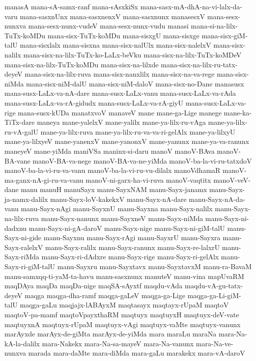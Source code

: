 {manasA
mana-sA-samx-ranf
mana-sAsxkiSx
mana-sasx-mA-dhA-na-vi-lalx-da-varu
mana-sasxnUnx
mana-sasxnenxV
mana-sasxnunx
manasesxV
mana-sesx-nunxva
mana-sesx-nunx-vudeV
mana-sesx-nunx-vudu
manasi
mana-si-na-lilx-TuTx-koMDu
mana-sisx-TuTx-koMDu
mana-sisxgU
mana-sisxge
mana-sisx-giM-talU
mana-sisxlalx
mana-sisxna
mana-sisx-nalUlx
mana-sisx-nalelxV
mana-sisx-nalilx
mana-sisx-na-lilx-TuTx-ko-LaLx-beVku
mana-sisx-na-lilx-TuTx-koMDeV
mana-sisx-na-lilx-TuTx-koMDu
mana-sisx-na-lilxde
mana-sisx-na-lilx-ru-tatx-deyeV
mana-sisx-na-lilx-ruva
mana-sisx-nanxlilx
mana-sisx-na-va-rege
mana-sisx-niMda
mana-sisx-niM-dalU
mana-sisx-niM-daloV
mana-sisx-no-Dane
manasusx
mana-susx-LaLx-va-nA-dare
mana-susx-LaLx-vanu
mana-susx-LaLx-va-rAda
mana-susx-LaLx-va-rA-gidudx
mana-susx-LaLx-va-rA-giyU
mana-susx-LaLx-va-rige
mana-susx-kUDa
manatxvoV
manaveV
mane
mane-ga-Lige
manege
mane-ka-TiTx-dare
maneya
mane-yalelxV
mane-yalilx
mane-ya-lilx-ru-vAga
mane-ya-lilx-ru-vA-galU
mane-ya-lilx-ruva
mane-ya-lilx-ru-va-va-ri-gelAlx
mane-ya-lilxyU
mane-ya-lilxyeV
mane-yanenxV
mane-yanonxV
mane-yanunx
mane-ya-va-ranunx
maneyeV
mane-yiMda
maniVSa
maninx-si-daru
manoV
manoV-BAva
manoV-BA-vane
manoV-BA-va-nege
manoV-BA-va-ne-yiMda
manoV-ba-la-vi-ru-tatxdoV
manoV-ba-la-vi-ru-va-vanu
manoV-ba-la-vi-ru-vu-dilalx
manoVdhamaR
manoV-ma-ganx-nA-gi-ru-va-vanu
manoV-ni-garx-ha-vi-ruva
manoV-vaqtitx
manoV-veV-dane
manu
manuH
manuSayx
manu-SayxNAM
manu-Sayx-janamx
manu-Sayx-ja-namx-dalilx
manu-Sayx-loV-kakekxV
manu-Sayx-nA-dare
manu-Sayx-nA-da-vanu
manu-Sayx-nAgi
manu-SayxnU
manu-Sayxna
manu-Sayx-nalilx
manu-Sayx-na-lilx-ruva
manu-Sayx-nanunx
manu-SayxneV
manu-Sayx-niMda
manu-Sayx-ni-dadxnu
manu-Sayx-ni-gA-daroV
manu-Sayx-nige
manu-Sayx-ni-giM-talU
manu-Sayx-ni-gide
manu-Sayxnu
manu-Sayx-rAgi
manu-SayxrU
manu-Sayxra
manu-Sayx-ralelxV
manu-Sayx-ralilx
manu-Sayx-ranunx
manu-Sayx-re-lalxrU
manu-Sayx-riMda
manu-Sayx-ri-dAdxre
manu-Sayx-rige
manu-Sayx-ri-gelAlx
manu-Sayx-ri-giM-talU
manu-Sayxru
manu-Sayxtavx
manu-SayxtavxM
manu-ra-BavaM
manu-samxqq-ti-yaM-ta-havu
manu-sasxnunx
manuteV
manu-vina
mapUvaRM
maqDAya
maqDa
maqDa-nige
maqSA-sAyxtf
maqdu-vAda
maqdu-vA-gu-tatx-deyeV
maqga
maqga-dha-ramf
maqga-gaLeV
maqga-ga-Lige
maqga-ga-Li-giM-talU
maqga-gaLu
maqjajx-lABAyxM
maqtasayx
maqtayx-rUpaM
maqtoV
maqtoV-pa-mamf
maqtoVpayxthaRM
maqtuyx
maqtuyxH
maqtuyx-deV-vate
maqtuyxnA
maqtuyx-rUpaM
maqtuyx-vAgi
maqtuyx-vaMte
maqtuyx-vanunx
marAyxde
marAyx-de-giMta
marAyx-de-yiMda
mara
maraLu
maraNa
mara-Na-kA-la-dalilx
mara-Nakekx
mara-Na-sa-mayeV
mara-Na-vanunx
mara-Na-ve-nunxva
marada
mara-daMte
mara-diMda
mara-gaLu
marakekx
mara-vA-daroV
}
